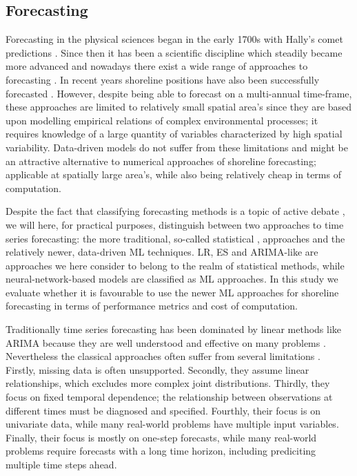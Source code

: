 \documentclass[format=sigconf, review=false, screen=true]{acmart}
\begin{document}
\subsection{Forecasting}

Forecasting in the physical sciences began in the early 1700s with Hally's comet predictions \citep{makridakis2020stateOfTheArt}. Since then it has been a scientific discipline which steadily became more advanced and nowadays there exist a wide range of approaches to forecasting \citep{Hyndman2018forecasting}. In recent years shoreline positions have also been successfully forecasted \citep{Davidson2010forecasting, Armenio2019coastline}. However, despite being able to forecast on a multi-annual time-frame, these approaches are limited to relatively small spatial area's since they are based upon modelling empirical relations of complex environmental processes; it requires knowledge of a large quantity of variables characterized by high spatial variability. Data-driven models do not suffer from these limitations and might be an attractive alternative to numerical approaches of shoreline forecasting; applicable at spatially large area's, while also being relatively cheap in terms of computation. 


Despite the fact that classifying forecasting methods is a topic of active debate \citep{januschowski2020criteria}, we will here, for practical purposes, distinguish between two approaches to time series forecasting: the more traditional, so-called statistical \citep{Makridakis2018m4}, approaches and the relatively newer, data-driven ML techniques. LR, ES and ARIMA-like are approaches we here consider to belong to the realm of statistical methods, while neural-network-based models are classified as ML approaches. In this study we evaluate whether it is favourable to use the newer ML approaches for shoreline forecasting in terms of performance metrics and cost of computation. 

Traditionally time series forecasting has been dominated by linear methods like ARIMA because they are well understood and effective on many problems \citep{brownlee2018deep}. Nevertheless the classical approaches often suffer from several limitations \citep{brownlee2018deep}. Firstly, missing data is often unsupported. Secondly, they assume linear relationships, which excludes more complex joint distributions. Thirdly, they focus on fixed temporal dependence; the relationship between observations at different times must be diagnosed and specified. Fourthly, their focus is on univariate data, while many real-world problems have multiple input variables. Finally, their focus is mostly on one-step forecasts, while many real-world problems require forecasts with a long time horizon, including prediciting multiple time steps ahead. 
\end{document}
